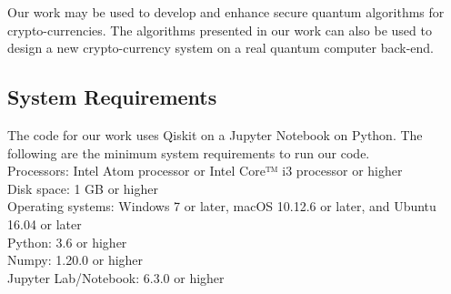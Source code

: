 Our work may be used to develop and enhance secure quantum algorithms for crypto-currencies. The algorithms presented in our work can also be used to design a new crypto-currency system on a real quantum computer back-end.
\subsection{System Requirements}
The code for our work uses Qiskit on a Jupyter Notebook on Python. The following are the minimum system requirements to run our code.\\
Processors: Intel Atom processor or Intel Core™ i3 processor or higher\\
Disk space: 1 GB or higher\\
Operating systems: Windows 7 or later, macOS 10.12.6 or later, and Ubuntu 16.04 or later\\
Python: 3.6 or higher\\
Numpy: 1.20.0 or higher\\
Jupyter Lab/Notebook: 6.3.0 or higher\\
